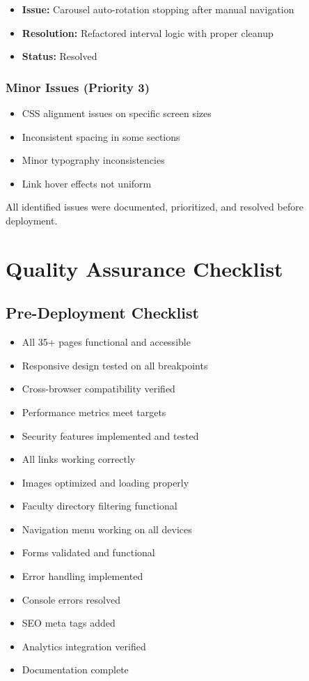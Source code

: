 \documentclass[12pt,a4paper]{report}
\begin{document}
\begin{itemize}
    \item \textbf{Issue:} Carousel auto-rotation stopping after manual navigation
    \item \textbf{Resolution:} Refactored interval logic with proper cleanup
    \item \textbf{Status:} Resolved
\end{itemize}

\subsubsection*{Minor Issues (Priority 3)}
\begin{itemize}
    \item CSS alignment issues on specific screen sizes
    \item Inconsistent spacing in some sections
    \item Minor typography inconsistencies
    \item Link hover effects not uniform
\end{itemize}

All identified issues were documented, prioritized, and resolved before deployment.

\section{Quality Assurance Checklist}

\subsection{Pre-Deployment Checklist}

\begin{itemize}
    \item[$\checkmark$] All 35+ pages functional and accessible
    \item[$\checkmark$] Responsive design tested on all breakpoints
    \item[$\checkmark$] Cross-browser compatibility verified
    \item[$\checkmark$] Performance metrics meet targets
    \item[$\checkmark$] Security features implemented and tested
    \item[$\checkmark$] All links working correctly
    \item[$\checkmark$] Images optimized and loading properly
    \item[$\checkmark$] Faculty directory filtering functional
    \item[$\checkmark$] Navigation menu working on all devices
    \item[$\checkmark$] Forms validated and functional
    \item[$\checkmark$] Error handling implemented
    \item[$\checkmark$] Console errors resolved
    \item[$\checkmark$] SEO meta tags added
    \item[$\checkmark$] Analytics integration verified
    \item[$\checkmark$] Documentation complete
\end{itemize}
\end{document}
